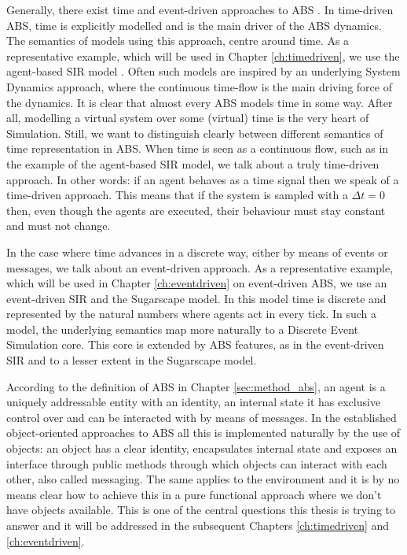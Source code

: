 Generally, there exist time and event-driven approaches to ABS \cite{meyer_event-driven_2014}. In time-driven ABS, time is explicitly modelled and is the main driver of the ABS dynamics. The semantics of models using this approach, centre around time. As a representative example, which will be used in Chapter \ref{ch:timedriven}, we use the agent-based SIR model \cite{macal_agent-based_2010, thaler_pure_2018}. Often such models are inspired by an underlying System Dynamics approach, where the continuous time-flow is the main driving force of the dynamics. It is clear that almost every ABS models time in some way. After all, modelling a virtual system over some (virtual) time is the very heart of Simulation. Still, we want to distinguish clearly between different semantics of time representation in ABS. When time is seen as a continuous flow, such as in the example of the agent-based SIR model, we talk about a truly time-driven approach. In other words: if an agent behaves as a time signal then we speak of a time-driven approach. This means that if the system is sampled with a $\Delta t = 0$ then, even though the agents are executed, their behaviour must stay constant and must not change.

In the case where time advances in a discrete way, either by means of events or messages, we talk about an event-driven approach. As a representative example, which will be used in Chapter \ref{ch:eventdriven} on event-driven ABS, we use an event-driven SIR and the Sugarscape model. In this model time is discrete and represented by the natural numbers where agents act in every tick. In such a model, the underlying semantics map more naturally to a Discrete Event Simulation core. This core is extended by ABS features, as in the event-driven SIR and to a lesser extent in the Sugarscape model.

According to the definition of ABS in  Chapter \ref{sec:method_abs}, an agent is a uniquely addressable entity with an identity, an internal state it has exclusive control over and can be interacted with by means of messages. In the established object-oriented approaches to ABS all this is implemented naturally by the use of objects: an object has a clear identity, encapsulates internal state and exposes an interface through public methods through which objects can interact with each other, also called messaging. The same applies to the environment and it is by no means clear how to achieve this in a pure functional approach where we don't have objects available. This is one of the central questions this thesis is trying to answer and it will be addressed in the subsequent Chapters \ref{ch:timedriven} and \ref{ch:eventdriven}.

